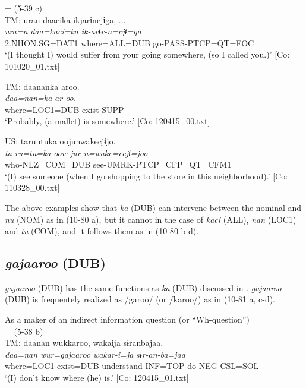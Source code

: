 \begin{xlist}
  \ex{} = (5-39 c)\\
    TM:
      \glll    uran  daacika  ikjarɨncjɨga, ...\\
      \textit{ura=n}  \textit{daa=kaci=ka}  \textit{ik-arɨr-n=cjɨ=ga}\\
      2.NHON.SG=DAT1  where=ALL=DUB  go-PASS-PTCP=QT=FOC\\
      \glt       ‘(I thought I) would suffer from your going somewhere, (so I called you.)’ [Co: 101020\_01.txt]

  \ex  TM:
      \glll    daananka  aroo.\\
      \textit{daa=nan=ka}  \textit{ar-oo.}\\
      where=LOC1=DUB  exist-SUPP\\
      \glt       ‘Probably, (a mallet) is somewhere.’ [Co: 120415\_00.txt]

  \ex   US: \glll taruutuka  oojunwakecjɨjo.\\
      \textit{ta-ru=tu=ka}  \textit{oow-jur-n=wake=ccjɨ=joo}\\
      who-NLZ=COM=DUB  see-UMRK-PTCP=CFP=QT=CFM1\\
      \glt       ‘(I) see someone (when I go shopping to the store in this neighborhood).’ [Co: 110328\_00.txt]
    \z
\z

The above examples show that \textit{ka} (DUB) can intervene between the nominal and \textit{nu} (NOM) as in (10-80 a), but it cannot in the case of \textit{kaci} (ALL), \textit{nan} (LOC1) and \textit{tu} (COM), and it follows them as in (10-80 b-d).

\subsection{\textit{gajaaroo} (DUB)}\label{sec:10.4.3}

\textit{gajaaroo} (DUB) has the same functions as \textit{ka} (DUB) discussed in . \textit{gajaaroo} (DUB) is frequentely realized as /garoo/ (or /karoo/) as in (10-81 a, c-d).

\ea\label{ex:10.81}   As a maker of an indirect information question (or “Wh-question”)\\
  \ea{} = (5-38 b)\\
    TM:
      \glll    daanan  wukkaroo,  wakaija  sɨranbajaa.\\
      \textit{daa=nan}  \textit{wur=gajaaroo}  \textit{wakar-i=ja}  \textit{sɨr-an-ba=jaa}\\
      where=LOC1  exist=DUB  understand-INF=TOP  do-NEG-CSL=SOL\\
      \glt       ‘(I) don’t know where (he) is.’ [Co: 120415\_01.txt]


\end{xlist}
